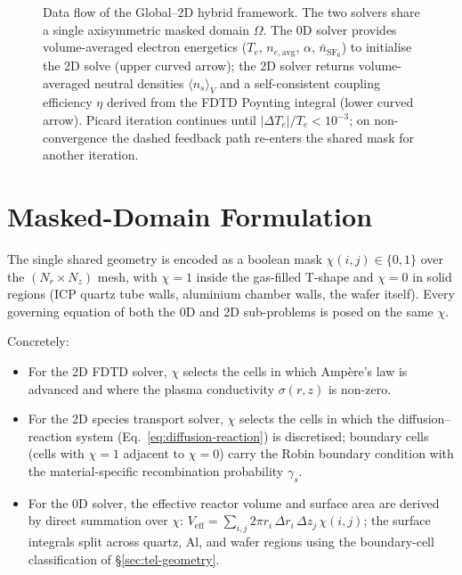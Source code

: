 \documentclass[11pt,a4paper]{report}
\begin{document}
\begin{figure}[H]
  \caption{Data flow of the Global--2D hybrid framework.  The two solvers share a single axisymmetric masked domain $\Omega$.  The 0D solver provides volume-averaged electron energetics ($T_e$, $n_{e,\mathrm{avg}}$, $\alpha$, $\bar n_{\mathrm{SF}_6}$) to initialise the 2D solve (upper curved arrow); the 2D solver returns volume-averaged neutral densities $\langle n_s\rangle_V$ and a self-consistent coupling efficiency $\eta$ derived from the FDTD Poynting integral (lower curved arrow).  Picard iteration continues until $|\Delta T_e|/T_e < 10^{-3}$; on non-convergence the dashed feedback path re-enters the shared mask for another iteration.}
  \label{fig:coupling-flow}
\end{figure}

\section{Masked-Domain Formulation}
\label{sec:masked-domain}

The single shared geometry is encoded as a boolean mask $\chi(i,j) \in \{0,1\}$ over the $(N_r \times N_z)$ mesh, with $\chi = 1$ inside the gas-filled T-shape and $\chi = 0$ in solid regions (ICP quartz tube walls, aluminium chamber walls, the wafer itself).  Every governing equation of both the 0D and 2D sub-problems is posed on the same $\chi$.

Concretely:
\begin{itemize}
  \item For the 2D FDTD solver, $\chi$ selects the cells in which Amp\`ere's law is advanced and where the plasma conductivity $\sigma(r,z)$ is non-zero.
  \item For the 2D species transport solver, $\chi$ selects the cells in which the diffusion--reaction system (Eq.~\ref{eq:diffusion-reaction}) is discretised; boundary cells (cells with $\chi = 1$ adjacent to $\chi = 0$) carry the Robin boundary condition with the material-specific recombination probability $\gamma_s$.
  \item For the 0D solver, the effective reactor volume and surface area are derived by direct summation over $\chi$: $V_\mathrm{eff} = \sum_{i,j} 2\pi r_i \,\Delta r_i\, \Delta z_j\, \chi(i,j)$; the surface integrals split across quartz, Al, and wafer regions using the boundary-cell classification of \S\ref{sec:tel-geometry}.
\end{itemize}
\end{document}
